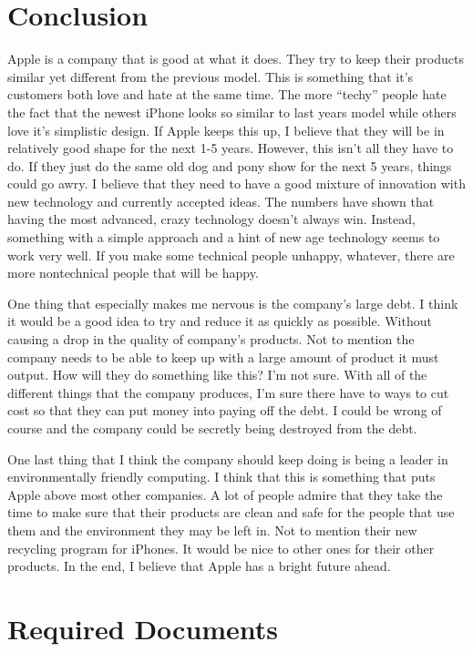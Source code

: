 \documentclass[12pt,a4paper,titlepage]{article}
\begin{document}
\newpage

\section{Conclusion}
Apple is a company that is good at what it does. They try to keep their products
similar yet different from the previous model. This is something that it's
customers both love and hate at the same time. The more ``techy'' people hate
the fact that the newest iPhone looks so similar to last years model while
others love it's simplistic design. If Apple keeps this up, I believe that they
will be in relatively good shape for the next 1-5 years. However, this isn't all
they have to do. If they just do the same old dog and pony show for the next 5
years, things could go awry. I believe that they need to have a good mixture of
innovation with new technology and currently accepted ideas. The numbers have
shown that having the most advanced, crazy technology doesn't always
win. Instead, something with a simple approach and a hint of new age technology
seems to work very well. If you make some technical people unhappy, whatever,
there are more nontechnical people that will be happy.

One thing that especially makes me nervous is the company's large debt. I think
it would be a good idea to try and reduce it as quickly as possible. Without
causing a drop in the quality of company's products. Not to mention the company
needs to be able to keep up with a large amount of product it must output. How
will they do something like this? I'm not sure. With all of the different things
that the company produces, I'm sure there have to ways to cut cost so that they
can put money into paying off the debt. I could be wrong of course and the
company could be secretly being destroyed from the debt.

One last thing that I think the company should keep doing is being a leader in
environmentally friendly computing. I think that this is something that puts
Apple above most other companies. A lot of people admire that they take the time
to make sure that their products are clean and safe for the people that use them
and the environment they may be left in. Not to mention their new recycling
program for iPhones. It would be nice to other ones for their other products. In
the end, I believe that Apple has a bright future ahead.

\newpage

\section{Required Documents}
\end{document}
